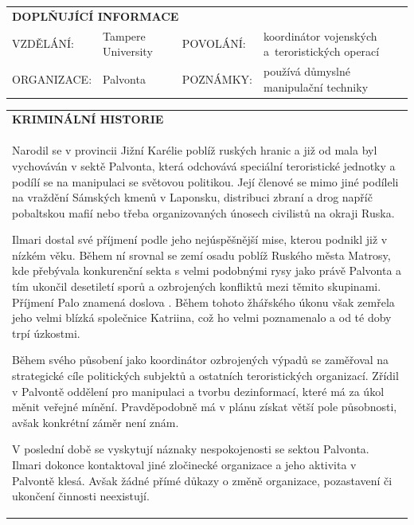 \documentclass[a4paper, 11pt]{article}
\newlength{\fontheight}
\def\bottomrulewidth{0.3mm}		%
\def\tabtitleextraheight{5pt}	%
\def\tablestretch{1.4}			%
\newcommand{\blackcell}{\cellcolor{black} \color{white} \ttfamily \bfseries}
\newcommand{\TI}[4]{\ttfamily \MakeUppercase{#1}: & \ttfamily #2 & \ttfamily \MakeUppercase{#3}: & \ttfamily #4 \\ \midrule}
\newcommand{\LTI}[4]{\ttfamily \MakeUppercase{#1}: & \ttfamily #2 & \ttfamily \MakeUppercase{#3}: & \ttfamily #4 \\ \bottomrule[\bottomrulewidth]}
\newcommand{\tabtitle}[2]{\multicolumn{#1}{l}{\blackcell \MakeUppercase{#2}\rule{0pt}{\dimexpr \fontheight + 1pt + \tabtitleextraheight \relax} } \\ [\tabtitleextraheight]}
\newcommand{\ind}{\hspace*{8mm}}
\begin{document}
	\vspace*{0.5cm}
	\begin{table}[H]
		\renewcommand\tabularxcolumn[1]{m{#1}}
		\def\arraystretch{\tablestretch}
		\begin{tabularx}{\textwidth}{l l l X}
			\tabtitle{4}{doplňující informace}
			\TI{vzdělání}{Tampere University}{povolání}{koordinátor vojenských a~teroristických operací}
			\LTI{organizace}{Palvonta}{poznámky}{používá důmyslné manipulační techniky}
		\end{tabularx}
	\end{table}
	
	\begin{table}[H]
		\renewcommand\tabularxcolumn[1]{m{#1}}
		\def\arraystretch{\tablestretch}
		\begin{tabularx}{\textwidth}{X}
			\tabtitle{1}{kriminální historie}
			\ttfamily
			\ind Narodil se v provincii Jižní Karélie poblíž ruských hranic a již od mala byl vychováván v sektě Palvonta, která odchovává speciální teroristické jednotky a podílí se na manipulaci se světovou politikou. Její členové se mimo jiné podíleli na vraždění Sámských kmenů v Laponsku, distribuci zbraní a drog napříč pobaltskou mafií nebo třeba organizovaných únosech civilistů na okraji Ruska.
			
			\ind Ilmari dostal své příjmení podle jeho nejúspěšnější mise, kterou podnikl již v nízkém věku. Během ní srovnal se zemí osadu poblíž Ruského města Matrosy, kde přebývala konkurenční sekta s velmi podobnými rysy jako právě Palvonta a tím ukončil desetiletí sporů a ozbrojených konfliktů mezi těmito skupinami. Příjmení Palo znamená doslova \uv{země vyčištěná ohněm}. Během tohoto žhářského úkonu však zemřela jeho velmi blízká společnice Katriina, což ho velmi poznamenalo a od té doby trpí úzkostmi.
			
			\ind Během svého působení jako koordinátor ozbrojených výpadů se zaměřoval na strategické cíle politických subjektů a ostatních teroristických organizací. Zřídil v Palvontě oddělení pro manipulaci a tvorbu dezinformací, které má za úkol měnit veřejné mínění. Pravděpodobně má v plánu získat větší pole působnosti, avšak konkrétní záměr není znám.
			
			\ind V poslední době se vyskytují náznaky nespokojenosti se sektou Palvonta. Ilmari dokonce kontaktoval jiné zločinecké organizace a jeho aktivita v Palvontě klesá. Avšak žádné přímé důkazy o změně organizace, pozastavení či ukončení činnosti neexistují.
			\\ \bottomrule[\bottomrulewidth]
		\end{tabularx}
	\end{table}
	
\end{document}
